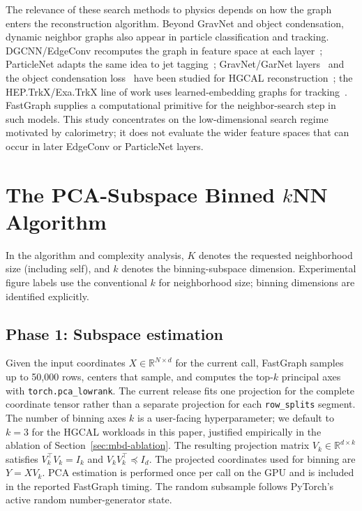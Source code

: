 \documentclass[final,3p,11pt]{elsarticle}
\newcommand{\mbdPCAdefault}{3}
\begin{document}
The relevance of these search methods to physics depends on how the
graph enters the reconstruction algorithm. Beyond GravNet and object
condensation, dynamic neighbor graphs also appear in particle
classification and tracking. DGCNN/EdgeConv recomputes the
graph in feature space at each layer~\cite{wang2019dynamic};
ParticleNet adapts the same idea to jet
tagging~\cite{qu2020particlenet}; GravNet/GarNet
layers~\cite{Qasim2019GravNet} and the object condensation
loss~\cite{Kieseler2020ObjectCondensation} have been studied for HGCAL
reconstruction~\cite{qasim2021multiparticle,bhattacharya2022gnn}; the
HEP.TrkX/Exa.TrkX line of work uses learned-embedding graphs for
tracking~\cite{ju2021performance,lazar2022accelerating,choma2020track}.
FastGraph supplies a computational primitive for the neighbor-search
step in such models. This study concentrates on the low-dimensional
search regime motivated by calorimetry; it does not evaluate the wider
feature spaces that can occur in later EdgeConv or ParticleNet layers.

\section{The PCA-Subspace Binned $k$NN Algorithm}
\label{sec:method}

In the algorithm and complexity analysis, $K$ denotes the requested
neighborhood size (including self), and $k$ denotes the binning-subspace
dimension. Experimental figure labels use the conventional $k$ for
neighborhood size; binning dimensions are identified explicitly.

\subsection{Phase 1: Subspace estimation}
\label{sec:phase1}

Given the input coordinates
$X \in \mathbb{R}^{N \times d}$ for the current call, FastGraph samples
up to 50,000 rows, centers that sample, and computes the top-$k$ principal
axes with \texttt{torch.pca\_lowrank}. The current release fits one
projection for the complete coordinate tensor rather than a separate
projection for each \texttt{row\_splits} segment. The number of
binning axes $k$ is a user-facing hyperparameter; we default to
$k = \mbdPCAdefault$ for the HGCAL workloads in this paper, justified
empirically in the ablation of Section~\ref{sec:mbd-ablation}. The
resulting projection matrix $V_k \in \mathbb{R}^{d \times k}$
satisfies $V_k^\top V_k = I_k$ and $V_k V_k^\top \preceq I_d$. The
projected coordinates used for binning are $Y = X V_k$. PCA estimation
is performed once per call on the GPU and is included in the reported
FastGraph timing. The random subsample follows PyTorch's active random
number-generator state.
\end{document}
